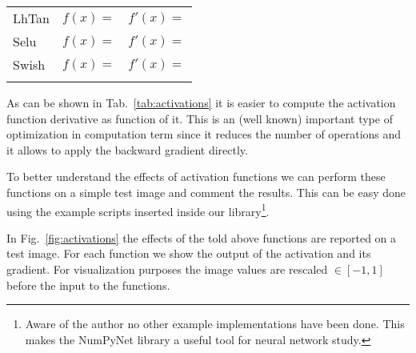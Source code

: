 \documentclass{standalone}
\begin{document}
\begin{table*}
\begin{tabular}{lcc}
LhTan    &  $f(x) = $                            &  $f'(x) = $                                                   \\

Selu     &  $f(x) = $                            &  $f'(x) = $                                                   \\

Swish    &  $f(x) = $                            &  $f'(x) = $                                                   \\

\hline\\
\end{tabular}
\caption{List of common activation functions with correspondig mathematical equation and derivative.
The derivative is expressed as function of $f(x)$ to optimize their numerical evaluation.}
\label{tab:activations}
\end{table*}



As can be shown in Tab.~\ref{tab:activations} it is easier to compute the activation function derivative as function of it.
This is an (well known) important type of optimization in computation term since it reduces the number of operations and it allows to apply the backward gradient directly.

To better understand the effects of activation functions we can perform these functions on a simple test image and comment the results.
This can be easy done using the example scripts inserted inside our library\footnote{
  Aware of the author no other example implementations have been done.
  This makes the NumPyNet library a useful tool for neural network study.
}.

In Fig.~\ref{fig:activations} the effects of the told above functions are reported on a test image.
For each function we show the output of the activation and its gradient.
For visualization purposes the image values are rescaled $\in[-1, 1]$ before the input to the functions.


\end{document}
